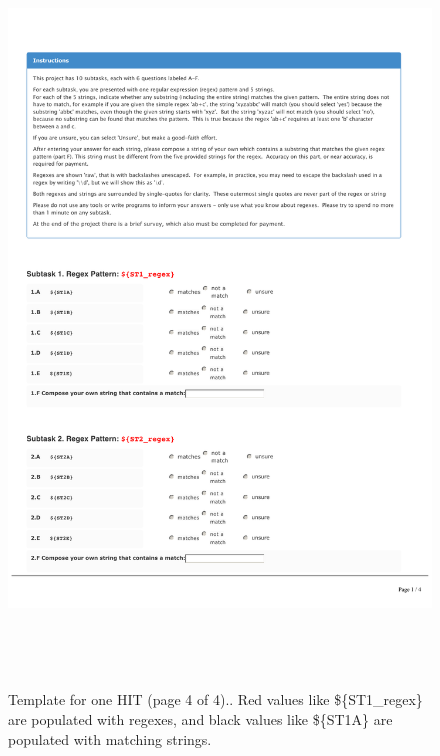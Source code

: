 \begin{figure}[!htbp]
       \includegraphics[page=4, height=20cm, keepaspectratio]{nontex/MTtemplate}
 \caption{Template for one HIT (page 4 of 4)..  Red values like  \$\{ST1\_regex\} are populated with regexes, and black values like \$\{ST1A\} are populated with matching strings.}
 \label{fig:MTtemplate4}
\end{figure}
\pagebreak
